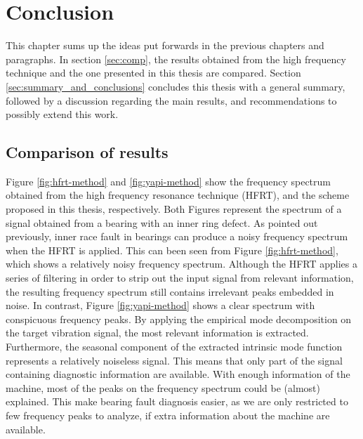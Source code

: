 \documentclass[../Main/thesis.tex]{subfiles}
\begin{document}
	\chapter[Conclusions]{Conclusion}
	\label{sec:conclusions}
	 This chapter sums up the ideas put forwards in the previous chapters and paragraphs. In section \ref{sec:comp}, the results obtained from the high frequency technique and the one presented in this thesis are compared.
	 Section \ref{sec:summary_and_conclusions} concludes this thesis with a general summary, followed by a discussion regarding the main results, and recommendations to possibly extend this work.

	
	\section{Comparison of results}
	Figure \ref{fig:hfrt-method} and \ref{fig:yapi-method} show the frequency spectrum obtained from the high frequency resonance technique (HFRT), and the scheme proposed in this thesis, respectively. Both Figures represent the spectrum of a signal obtained from a bearing with an inner ring defect. As pointed out previously, inner race fault in bearings can produce a noisy frequency spectrum when the HFRT is applied. This can been seen from Figure \ref{fig:hfrt-method}, which shows a relatively noisy frequency spectrum. Although the HFRT applies a series of filtering in order to strip out the input signal from relevant information, the resulting frequency spectrum still contains irrelevant peaks embedded in noise.
	\justify
	In contrast, Figure \ref{fig:yapi-method} shows a clear spectrum with conspicuous frequency peaks. By applying the empirical mode decomposition on the target vibration signal, the most relevant information is extracted. Furthermore, the seasonal component of the extracted intrinsic mode function represents a relatively noiseless signal. This means that only part of the signal containing diagnostic information are available. With enough information of the machine, most of the peaks on the frequency spectrum could be (almost) explained. This make bearing fault diagnosis easier, as we are only restricted to few frequency peaks to analyze, if extra information about the machine are available.
\end{document}
